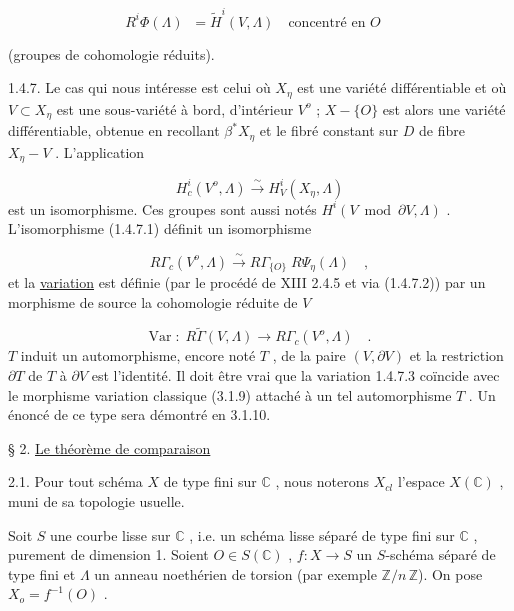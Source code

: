\begin{equation*}
R^i \Phi(\Lambda) \;\; = \widetilde{H}^i(V, \Lambda) \quad \text{concentré en } O \quad 
\end{equation*}


 (groupes de cohomologie réduits).

1.4.7. Le cas qui nous intéresse est celui où $X_\eta$ est une variété différentiable et où $V \subset X_\eta$ est une sous-variété à bord, d'intérieur $V^o$ ; $X-\{O\}$ est alors une variété différentiable, obtenue en recollant $\beta^* X_\eta$ et le fibré constant sur $D$ de fibre $X_\eta - V$ . L'application

\begin{equation}\tag{1.4.7.1}
H^i_c(V^o, \Lambda) \overset{\sim}{\longrightarrow} H^i_V(X_\eta , \Lambda)
\end{equation}
est un isomorphisme. Ces groupes sont aussi notés $H^i(V \bmod \partial V, \Lambda)$ . L'isomorphisme (1.4.7.1) définit un isomorphisme

\begin{equation}\tag{1.4.7.2}
R\Gamma_c(V^o, \Lambda ) \overset{\sim}{\longrightarrow} R\Gamma_{\{O\}} \; R\Psi_\eta(\Lambda ) \quad ,
\end{equation}
et la \underline{variation} est définie (par le procédé de XIII 2.4.5 et via (1.4.7.2)) par un morphisme de source la cohomologie réduite de $V$

\begin{equation}\tag{1.4.7.3}
\mathrm{Var} \; : \; R\widetilde{\Gamma}(V, \Lambda) \longrightarrow R\Gamma_c(V^o, \Lambda) \quad .
\end{equation}
$T$ induit un automorphisme, encore noté $T$ , de la paire $(V, \partial V)$ et la restriction $\partial T$ de $T$ à $\partial V$ est l'identité. Il doit être vrai que la variation 1.4.7.3 coïncide avec le morphisme variation classique (3.1.9) attaché à un tel automorphisme $T$ . Un énoncé de ce type sera démontré en 3.1.10.


§ 2. \underline{Le théorème de comparaison}

2.1. Pour tout schéma $X$ de type fini sur $\mathbb{C}$ , nous noterons $X_{cl}$ l'espace $X(\mathbb{C})$ , muni de sa topologie usuelle.

Soit $S$ une courbe lisse sur $\mathbb{C}$ , i.e. un schéma lisse séparé de type fini sur $\mathbb{C}$ , purement de dimension 1. Soient $O \in S(\mathbb{C})$ , $f : X \longrightarrow S$ un $S$-schéma séparé de type fini et $\Lambda$ un anneau noethérien de torsion (par exemple $\mathbb{Z}/n\,\mathbb{Z}$). On pose $X_o = f^{-1}(O)$ .


